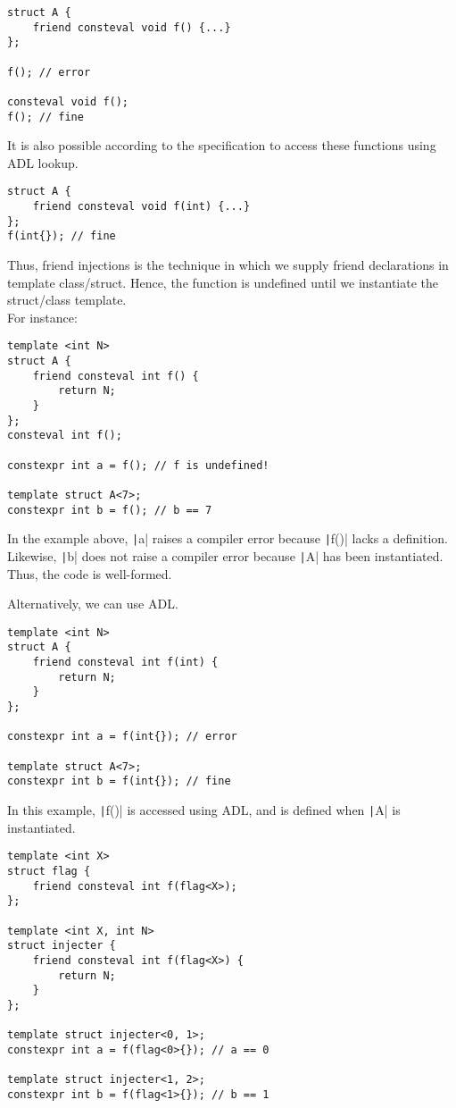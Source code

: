 \begin{verbatim}
struct A {
    friend consteval void f() {...}
};

f(); // error

consteval void f();
f(); // fine
	\end{verbatim}

	It is also possible according to the specification to access these functions using ADL lookup.
	\begin{verbatim}
struct A {
    friend consteval void f(int) {...}
};
f(int{}); // fine
	\end{verbatim}

	Thus, friend injections is the technique in which we supply friend declarations in template class/struct. Hence, the function is undefined until we instantiate the struct/class template. \\

	For instance:

	\begin{verbatim}
template <int N>
struct A {
    friend consteval int f() { 
        return N; 
    }
};
consteval int f();

constexpr int a = f(); // f is undefined!

template struct A<7>;
constexpr int b = f(); // b == 7
	\end{verbatim}

	In the example above, \texttt|a| raises a compiler error because \texttt|f()| lacks a definition. Likewise, \texttt|b| does not raise a compiler error because \texttt|A| has been instantiated. Thus, the code is well-formed.

	Alternatively, we can use ADL.
	\begin{verbatim}
template <int N>
struct A {
    friend consteval int f(int) { 
        return N; 
    }
};

constexpr int a = f(int{}); // error

template struct A<7>;
constexpr int b = f(int{}); // fine
	\end{verbatim}

	In this example, \texttt|f()| is accessed using ADL, and is defined when \texttt|A| is instantiated.

	\begin{verbatim}
template <int X>
struct flag {
    friend consteval int f(flag<X>);
};

template <int X, int N>
struct injecter {
    friend consteval int f(flag<X>) { 
        return N; 
    }
};

template struct injecter<0, 1>;
constexpr int a = f(flag<0>{}); // a == 0

template struct injecter<1, 2>;
constexpr int b = f(flag<1>{}); // b == 1
	\end{verbatim}
	
